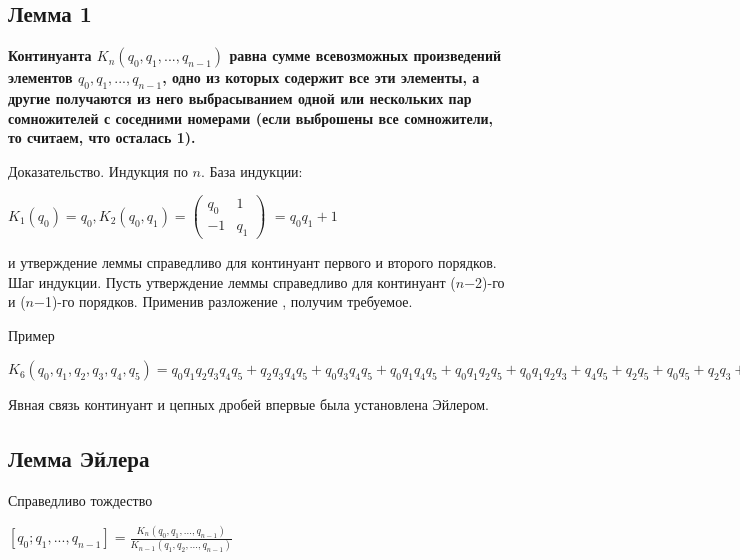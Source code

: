 \documentclass[12pt]{article}
\begin{document}
\subsection{Лемма 1}
\textbf{Континуанта $K_n(q_0, q_1, . . . , q_{n−1})$ равна сумме всевозможных произведений элементов $q_0, q_1, . . . , q_{n−1}$, одно из которых содержит
    все эти элементы, а другие получаются из него выбрасыванием одной или
    нескольких пар сомножителей с соседними номерами (если выброшены все
    сомножители, то считаем, что осталась 1).}\par
Доказательство. Индукция по $n$. База индукции:\par
$K_1(q_0) = q_0, K_2(q_0, q_1) = $$\begin{pmatrix}
            q_0 & 1   \\
            -1  & q_1
        \end{pmatrix}$
$= q_0q_1 + 1$\par
            и утверждение леммы справедливо для континуант первого и второго порядков.
            Шаг индукции. Пусть утверждение леммы справедливо для континуант ($n$−2)-го и ($n$−1)-го порядков. Применив разложение , получим
            требуемое. \par

            Пример\par
        $K_6(q_0, q_1, q_2, q_3, q_4, q_5) = q_0 q_1 q_2 q_3 q_4 q_5 + q_2 q_3 q_4 q_5 + q_0 q_3 q_4 q_5 + q_0 q_1 q_4 q_5 + q_0 q_1 q_2 q_5 + q_0 q_1 q_2 q_3 + q_4 q_5 + q_2 q_5 + q_0 q_5 + q_2 q_3 + q_0 q_3 + q_0 q_1 + 1$\par
            Явная связь континуант и цепных дробей впервые была установлена
            Эйлером.
            \subsection{Лемма Эйлера}
            Справедливо тождество\par
        $[q_0;q_1,...,q_{n-1}] = \frac{K_n(q_0, q_1, . . . , q_{n−1})}{K_{n-1}(q_1, q_2, . . . , q_{n−1})}$\par
\end{document}
